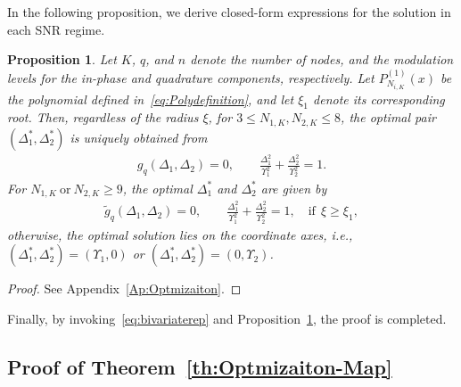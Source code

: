 \documentclass[journal,12pt,onecolumn,draftclsnofoot]{IEEEtran}
\newtheorem{prop}{Proposition}
\theoremstyle{definition}
\begin{document}
In the following proposition, we derive closed-form expressions for the solution in each SNR regime.



\begin{prop}\label{Pr:Optmizaiton}
    Let $K$, $q$, and $n$ denote the number of nodes, and the modulation levels for the in-phase and quadrature components, respectively. 
    Let $P^{(1)}_{N_{i,K}}(x)$ be the polynomial defined in~\eqref{eq:Polydefinition}, and let $\xi_1$ denote its corresponding root. 
    Then, regardless of the radius $\xi$, for $3 \leq N_{1,K}, N_{2,K} \leq 8$, the optimal pair $(\Delta_1^*, \Delta_2^*)$ is uniquely obtained from
    \begin{align}
        \label{eq:uniqeg0-pr}
        g_q(\Delta_1, \Delta_2) = 0, 
        \qquad 
        \frac{\Delta_1^2}{\Upsilon_1^2} + \frac{\Delta_2^2}{\Upsilon_2^2} = 1.
    \end{align}
    For $N_{1,K}~\text{or}~N_{2,K} \geq 9$, the optimal $\Delta_1^*$ and $\Delta_2^*$ are given by
    \begin{align}
        \label{eq:uniqeg}
        \tilde{g}_q(\Delta_1, \Delta_2) = 0, 
        \qquad 
        \frac{\Delta_1^2}{\Upsilon_1^2} + \frac{\Delta_2^2}{\Upsilon_2^2} = 1,
        \quad \text{if}~~\xi \geq \xi_1,
    \end{align}
    otherwise, the optimal solution lies on the coordinate axes, i.e., 
    \((\Delta_1^*, \Delta_2^*) = (\Upsilon_1, 0)\) or 
    \((\Delta_1^*, \Delta_2^*) = (0, \Upsilon_2)\).
\end{prop}
\begin{proof}
    See Appendix~\ref{Ap:Optmizaiton}.
\end{proof}

Finally, by invoking~\eqref{eq:bivariaterep} and Proposition~\ref{Pr:Optmizaiton}, the proof is completed.



\subsection{Proof of Theorem~\ref{th:Optmizaiton-Map}}\label{sec:prioir}
\end{document}
